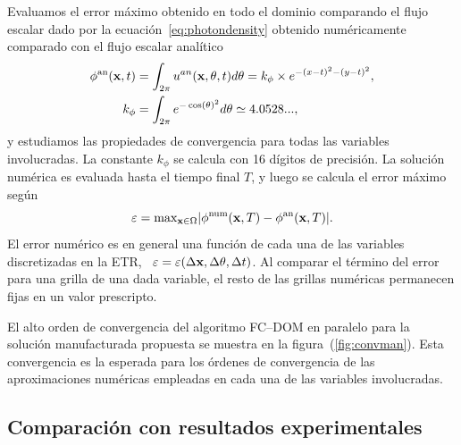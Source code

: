 Evaluamos el error máximo obtenido en todo el dominio 
comparando el flujo escalar dado por la ecuación~\eqref{eq:photondensity} 
obtenido numéricamente comparado con el flujo escalar analítico
\begin{equation*}
\begin{split}
\begin{aligned}
\phi^{\text{an}}(\mathbf{x},t)&=\int_{2\pi} u^{an}(\mathbf{x},\theta,t) d\theta=
k_{\phi}\times e^{-(x-t)^2-(y-t)^2},\\
k_{\phi}&=\int_{2\pi}e^{-\cos(\theta)^2}d\theta\simeq 4.0528...,
\end{aligned}
\end{split}
\label{eq:photondensityan}
\end{equation*}
y estudiamos las propiedades de convergencia 
para todas las variables involucradas. La constante 
$k_{\phi}$ se calcula con 16 dígitos de precisión. 
La solución numérica es evaluada hasta el tiempo final $T$, 
y luego se calcula el error máximo según
\begin{equation*}
\varepsilon=\text{max}_{\mathbf{x} \in \Omega} |\phi^{\text{num}}(\mathbf{x},T) -\phi^{\text{an}}(\mathbf{x},T)|.
\label{eq:maximumerror}
\end{equation*}
El error numérico es en general una función 
de cada una de las variables discretizadas en la ETR, 
\ie~$\varepsilon=\varepsilon(\Delta \mathbf{x}, \Delta \theta, \Delta t)$. 
Al comparar el término del error para una grilla de una dada variable, 
el resto de las grillas numéricas permanecen fijas en un valor prescripto.

El alto orden de convergencia del algoritmo FC--DOM en paralelo 
para la solución manufacturada propuesta se muestra en la figura~(\ref{fig:convman}). 
Esta convergencia es la esperada para 
los órdenes de convergencia de las aproximaciones 
numéricas empleadas 
en cada una de las variables involucradas. 
\pagebreak
\clearpage
\subsection{Comparación con resultados experimentales}
\label{sec:resexp}

